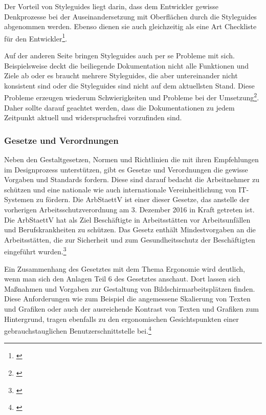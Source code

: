 Der Vorteil von Styleguides liegt darin, dass dem Entwickler gewisse Denkprozesse bei der Auseinandersetzung mit Oberflächen durch die Styleguides abgenommen werden. Ebenso dienen sie auch gleichzeitig als eine Art Checkliste für den Entwickler\footnote{\cite[vgl.][214]{Thomaschewski2013}}.

Auf der anderen Seite bringen Styleguides auch per se Probleme mit sich. Beispielsweise deckt die beiliegende Dokumentation nicht alle Funktionen und Ziele ab oder es braucht mehrere Styleguides, die aber untereinander nicht konsistent sind oder die Styleguides sind nicht auf dem aktuellsten Stand. Diese Probleme erzeugen wiederum Schwierigkeiten und Probleme bei der Umsetzung\footnote{\cite[vgl.][215]{Thomaschewski2013}}. Daher sollte darauf geachtet werden, dass die Dokumentationen zu jedem Zeitpunkt aktuell und widerspruchsfrei vorzufinden sind.


\subsubsection{Gesetze und Verordnungen}
\label{sec:gesetzeUndVerordnungen}
Neben den Gestaltgesetzen, Normen und Richtlinien die mit ihren Empfehlungen im Designprozess unterstützen, gibt es Gesetze und Verordnungen die gewisse Vorgaben und Standards fordern. Diese sind darauf bedacht die Arbeitnehmer zu schützen und eine nationale wie auch internationale Vereinheitlichung von IT-Systemen zu fördern. Die \gls{ArbStaettV} ist einer dieser Gesetze, das anstelle der vorherigen Arbeitsschutzverordnung am 3. Dezember 2016 in Kraft getreten ist. Die \gls{ArbStaettV} hat als Ziel Beschäftigte in Arbeitsstätten vor Arbeitsunfällen und Berufskrankheiten zu schützen. Das Gesetz enthält Mindestvorgaben an die Arbeitsstätten, die zur Sicherheit und zum Gesundheitsschutz der Beschäftigten eingeführt wurden.\footnote{\cite[vgl.][]{BAuA}}

Ein Zusammenhang des Gesetztes mit dem Thema Ergonomie wird deutlich, wenn man sich den Anlagen Teil 6 des Gesetztes anschaut. Dort lassen sich Maßnahmen und Vorgaben zur Gestaltung von Bildschirmarbeitsplätzen finden. Diese Anforderungen wie zum Beispiel die angemessene Skalierung von Texten und Grafiken oder auch der ausreichende Kontrast von Texten und Grafiken zum Hintergrund, tragen ebenfalls zu den ergonomischen Gesichtspunkten einer gebrauchstauglichen Benutzerschnittstelle bei.\footnote{\cite[vgl.][Anhang: Kap. 6]{ArbStaettV}}

